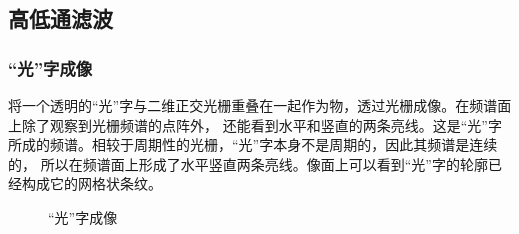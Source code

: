 \documentclass{article}
\begin{document}
    \subsection{高低通滤波}
    \subsubsection{“光”字成像}
    将一个透明的“光”字与二维正交光栅重叠在一起作为物，透过光栅成像。在频谱面上除了观察到光栅频谱的点阵外，
    还能看到水平和竖直的两条亮线。这是“光”字所成的频谱。相较于周期性的光栅，“光”字本身不是周期的，因此其频谱是连续的，
    所以在频谱面上形成了水平竖直两条亮线。像面上可以看到“光”字的轮廓已经构成它的网格状条纹。

    \begin{figure}[h]
        \centering
        \caption{“光”字成像}
    \end{figure}
\end{document}
